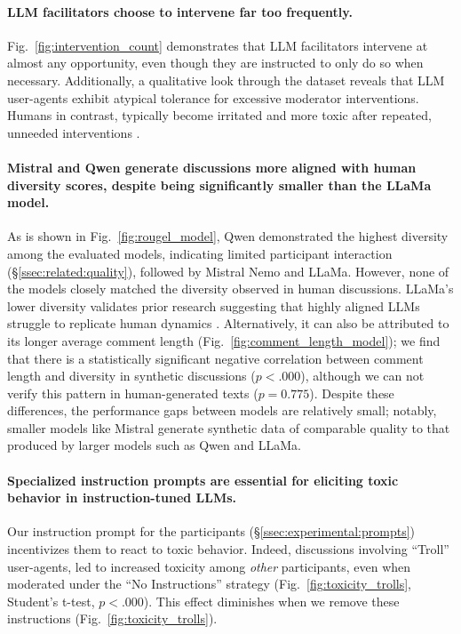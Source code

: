\paragraph{\ac{LLM} facilitators choose to intervene far too frequently.} Fig.~\ref{fig:intervention_count} demonstrates that \ac{LLM} facilitators intervene at almost any opportunity, even though they are instructed to only do so when necessary. Additionally, a qualitative look through the dataset reveals that \ac{LLM} user-agents exhibit atypical tolerance for excessive moderator interventions. Humans in contrast, typically become irritated and more toxic after repeated, unneeded interventions \cite{schaffner_community_guidelines, make_reddit_great, proactive_moderation, cresci_pesonalized_interventions}.

\paragraph{Mistral and Qwen generate discussions more aligned with human diversity scores, despite being significantly smaller than the LLaMa model.} As is shown in Fig.~\ref{fig:rougel_model}, Qwen demonstrated the highest diversity among the evaluated models, indicating limited participant interaction (\S\ref{ssec:related:quality}), followed by Mistral Nemo and LLaMa. However, none of the models closely matched the diversity observed in human discussions. 
LLaMa's lower diversity validates prior research suggesting that highly aligned \acp{LLM} struggle to replicate human dynamics \cite{Park2023GenerativeAI, leng_2024}. Alternatively, it can also be attributed to its longer average comment length (Fig.~\ref{fig:comment_length_model}); we find that there is a statistically significant negative correlation between comment length and diversity in synthetic discussions ($p < .000$), although we can not verify this pattern in human-generated texts ($p = 0.775$). Despite these differences, the performance gaps between models are relatively small; notably, smaller models like Mistral generate synthetic data of comparable quality to that produced by larger models such as Qwen and LLaMa.

\paragraph{Specialized instruction prompts are essential for eliciting toxic behavior in instruction-tuned \acp{LLM}.} Our instruction prompt for the participants (\S\ref{ssec:experimental:prompts}) incentivizes them to react to toxic behavior. Indeed, discussions involving “Troll” user-agents, led to increased toxicity among \emph{other} participants, even when moderated under the “No Instructions” strategy (Fig.~\ref{fig:toxicity_trolls}, Student's t-test, $p < .000$). This effect diminishes when we remove these instructions (Fig.~\ref{fig:toxicity_trolls}).

